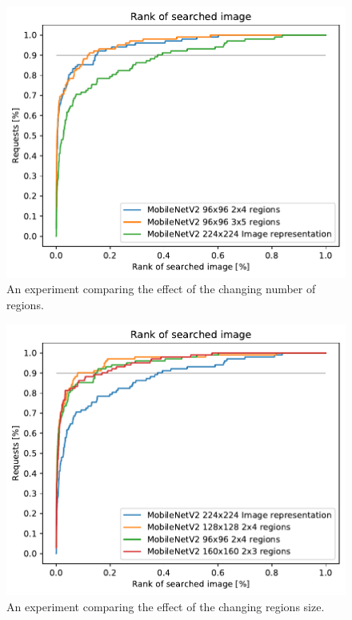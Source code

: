 \begin{figure}
\centering
\includegraphics[width=0.8\linewidth]{graphs/0c36458e4a7754f349e4dd02e823acc5f192f0aaa42647313045530525f3db19.pdf}
\caption{An experiment comparing the effect of the changing number of regions.}
\label{fig:different_number_regions}
\end{figure}

\begin{figure}
\centering
\includegraphics[width=0.8\linewidth]{graphs/901175c0015f71987720d10953133afa566d88a09a6d7182a074859ff4e8409e.pdf}
\caption{An experiment comparing the effect of the changing regions size.}
\label{fig:different_region_size}
\end{figure}

